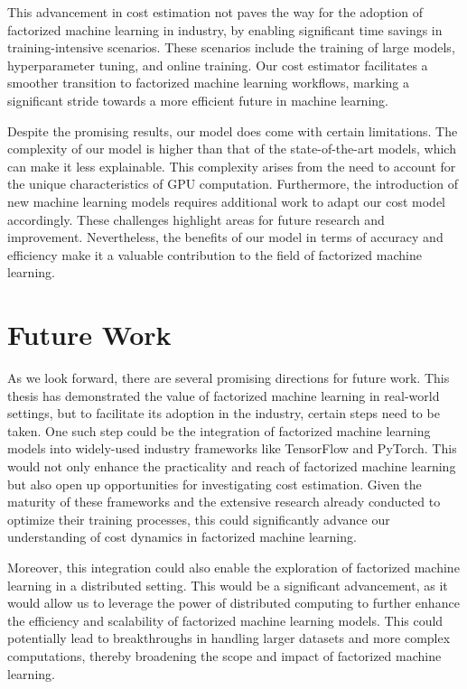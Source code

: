 This advancement in cost estimation not paves the way for the adoption of factorized machine learning in industry, by enabling significant time savings in training-intensive scenarios. These scenarios include the training of large models, hyperparameter tuning, and online training. Our cost estimator facilitates a smoother transition to factorized machine learning workflows, marking a significant stride towards a more efficient future in machine learning.

Despite the promising results, our model does come with certain limitations. The complexity of our model is higher than that of the state-of-the-art models, which can make it less explainable. This complexity arises from the need to account for the unique characteristics of GPU computation. Furthermore, the introduction of new machine learning models requires additional work to adapt our cost model accordingly. These challenges highlight areas for future research and improvement. Nevertheless, the benefits of our model in terms of accuracy and efficiency make it a valuable contribution to the field of factorized machine learning.

\section{Future Work}
\label{sec:7-future-work}
As we look forward, there are several promising directions for future work. This thesis has demonstrated the value of factorized machine learning in real-world settings, but to facilitate its adoption in the industry, certain steps need to be taken. One such step could be the integration of factorized machine learning models into widely-used industry frameworks like TensorFlow and PyTorch. This would not only enhance the practicality and reach of factorized machine learning but also open up opportunities for investigating cost estimation. Given the maturity of these frameworks and the extensive research already conducted to optimize their training processes, this could significantly advance our understanding of cost dynamics in factorized machine learning.

Moreover, this integration could also enable the exploration of factorized machine learning in a distributed setting. This would be a significant advancement, as it would allow us to leverage the power of distributed computing to further enhance the efficiency and scalability of factorized machine learning models. This could potentially lead to breakthroughs in handling larger datasets and more complex computations, thereby broadening the scope and impact of factorized machine learning.

